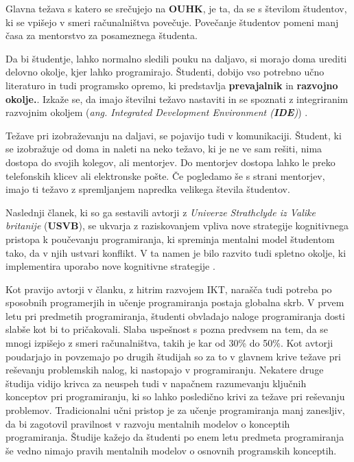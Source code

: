 Glavna težava s katero se srečujejo na \textbf{OUHK}, je ta, da se s
številom študentov, ki se vpišejo v smeri računalništva
povečuje. Povečanje študentov pomeni manj časa za mentorstvo za
posameznega študenta.

Da bi študentje, lahko normalno sledili pouku na daljavo, si morajo
doma urediti delovno okolje, kjer lahko programirajo. Študenti,
dobijo vso potrebno učno literaturo in tudi programsko opremo, ki
predstavlja \textbf{prevajalnik} in \textbf{razvojno okolje.}. Izkaže se,
da imajo številni težavo nastaviti in se spoznati z integriranim
razvojnim okoljem (\emph{ang. Integrated Development Environment
  (\textbf{IDE})}) \cite{ITaLCP_DistanceEdu}.

Težave pri izobraževanju na daljavi, se pojavijo tudi v
komunikaciji. Študent, ki se izobražuje od doma in naleti na neko
težavo, ki je ne ve sam rešiti, nima dostopa do svojih kolegov, ali
mentorjev. Do mentorjev dostopa lahko le preko telefonskih klicev ali
elektronske pošte. Če pogledamo še s strani mentorjev, imajo ti težavo
z spremljanjem napredka velikega števila študentov.


Naslednji članek, ki so ga sestavili avtorji z \emph{Univerze
  Strathclyde iz Valike britanije} (\textbf{USVB}), se ukvarja z
raziskovanjem vpliva nove strategije kognitivnega pristopa k
poučevanju programiranja, ki spreminja mentalni model študentom tako,
da v njih ustvari konflikt. V ta namen je bilo razvito tudi spletno
okolje, ki implementira uporabo nove kognitivne strategije
\cite{mentalModels}.


Kot pravijo avtorji v članku, z hitrim razvojem IKT, narašča tudi
potreba po sposobnih programerjih in učenje programiranja postaja
globalna skrb. V prvem letu pri predmetih programiranja, študenti
obvladajo naloge programiranja dosti slabše kot bi to
pričakovali. Slaba uspešnost s pozna predvsem na tem, da se mnogi
izpišejo z smeri računalništva, takih je kar od 30\% do 50\%. Kot
avtorji poudarjajo in povzemajo po drugih študijah so za to v glavnem
krive težave pri reševanju problemskih nalog, ki nastopajo v
programiranju. Nekatere druge študija vidijo krivca za neuspeh tudi v
napačnem razumevanju ključnih konceptov pri programiranju, ki so lahko
posledično krivi za težave pri reševanju problemov. Tradicionalni učni
pristop je za učenje programiranja manj zanesljiv, da bi zagotovil
pravilnost v razvoju mentalnih modelov o konceptih
programiranja. Študije kažejo da študenti po enem letu predmeta
programiranja še vedno nimajo pravih mentalnih modelov o osnovnih
programskih konceptih.

